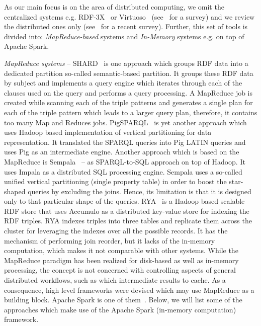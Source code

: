As our main focus is on the area of distributed computing, we omit the centralized systems e.g. RDF-3X~\cite{Neumann2008RRE} or Virtuoso~\cite{Erling2010} (see~\cite{faye2012survey} for a survey) and we review the distributed ones only (see~\cite{kaoudi2015rdf} for a recent survey).
Further, this set of tools is divided into: \textit{MapReduce-based} systems and \textit{In-Memory} systems e.g. on top of Apache Spark.

\textit{MapReduce systems} -- SHARD~\cite{Rohloff2010} is one approach which groups RDF data into a dedicated partition so-called semantic-based partition.
It groups these RDF data by subject and implements a query engine which iterates through each of the clauses used on the query and performs a query processing.
A MapReduce job is created while scanning each of the triple patterns and generates a single plan for each of the triple pattern which leads to a larger query plan, therefore, it contains too many Map and Reduces jobs.
PigSPARQL~\cite{Schatzle2011PMS} is yet another approach which uses Hadoop based implementation of vertical partitioning for data representation.
It translated the SPARQL queries into Pig LATIN queries and uses Pig as an intermediate engine.
Another approach which is based on the MapReduce is Sempala~\cite{Schatzle2014Sempala} -- as SPARQL-to-SQL approach on top of Hadoop.
It uses Impala as a distributed SQL processing engine.
Sempala uses a so-called unified vertical partitioning (single property table) in order to boost the star-shaped queries by excluding the joins.
Hence, its limitation is that it is designed only to that particular shape of the queries.
RYA~\cite{Punnoose2012Rya} is a Hadoop based scalable RDF store that uses Accumulo as a distributed key-value store for indexing the RDF triples.
RYA indexes triples into three tables and replicate them across the cluster for leveraging the indexes over all the possible records.
It has the mechanism of performing join reorder, but it lacks of the in-memory computation, which makes it not comparable with other systems.
While the MapReduce paradigm has been realized for disk-based as well as in-memory processing, the concept is not concerned with controlling aspects of general distributed workflows, such as which intermediate results to cache. As a consequence, high level frameworks were devised which may use MapReduce as a building block.%
Apache Spark is one of them~\cite{zaharia2012resilient}.
Below, we will list some of the approaches which make use of the Apache Spark (in-memory computation) framework.

